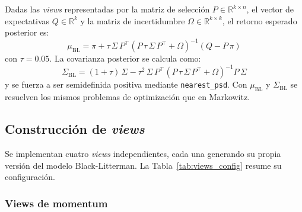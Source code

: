 Dadas las \textit{views} representadas por la matriz de selecci\'on
$P \in \mathbb{R}^{k \times n}$, el vector de expectativas
$Q \in \mathbb{R}^k$ y la matriz de incertidumbre
$\Omega \in \mathbb{R}^{k \times k}$, el retorno esperado posterior es:
\begin{equation}
\mu_{\text{BL}} = \pi + \tau\,\Sigma\, P^\top
\left(P\,\tau\,\Sigma\, P^\top + \Omega\right)^{-1}
(Q - P\,\pi)
\end{equation}
con $\tau = 0.05$. La covarianza posterior se calcula como:
\begin{equation}
\Sigma_{\text{BL}} = (1+\tau)\,\Sigma
- \tau^2\,\Sigma\, P^\top
\left(P\,\tau\,\Sigma\, P^\top + \Omega\right)^{-1}
P\,\Sigma
\end{equation}
y se fuerza a ser semidefinida positiva mediante \texttt{nearest\_psd}. Con
$\mu_{\text{BL}}$ y $\Sigma_{\text{BL}}$ se resuelven los mismos problemas de
optimizaci\'on que en Markowitz.

\subsection{Construcci\'on de \textit{views}}

Se implementan cuatro \textit{views} independientes, cada una generando su
propia versi\'on del modelo Black-Litterman. La
Tabla~\ref{tab:views_config} resume su configuraci\'on.

\begin{table}[h]
\centering
\caption{Configuración de las cuatro variantes de \textit{views} Black-Litterman.}
\label{tab:views_config}
\scriptsize
\setlength{\tabcolsep}{4pt}
\renewcommand{\arraystretch}{0.9}
\end{table}


\subsubsection{Views de momentum}

